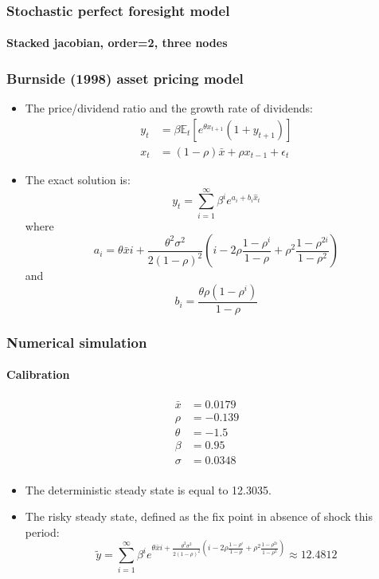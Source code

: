 \documentclass{beamer}
\begin{document}
\begin{frame}
    \frametitle{Stochastic perfect foresight model}
    \framesubtitle{Stacked jacobian, order=2, three nodes}
  \begin{center}
    \scalebox{.5}{
  }
  \end{center}

\end{frame}


\begin{frame}
  \frametitle{Burnside (1998) asset pricing model}

\begin{itemize}

  \item The price/dividend ratio and the growth rate of dividends:
  \[
    \begin{split}
      y_t &= \beta \mathbb E_t\left[e^{\theta x_{t+1}}\left(1+y_{t+1}\right)\right]\\
      x_t &= (1-\rho)\bar x + \rho x_{t-1}+\epsilon_t
    \end{split}
  \]

  \item The exact solution is:
\[
    y_t = \sum_{i=1}^\infty \beta^i e^{a_i+b_i\hat x_t}
\]
where
\[
    a_i = \theta \bar x i +
\frac{\theta^2\sigma^2}{2(1-\rho)^2}\left(i-2\rho\frac{1-\rho^i}{1-\rho}+\rho^2\frac{1-\rho^{2i}}{1-\rho^2}\right)
\]
and
\[
b_i = \frac{\theta\rho\left(1-\rho^i\right)}{1-\rho}
\]

\end{itemize}

\end{frame}


\begin{frame}
  \frametitle{Numerical simulation}
   \framesubtitle{Calibration}

\begin{align*}
  \bar x &= 0.0179\\
  \rho &=  -0.139\\
  \theta &= -1.5\\
  \beta &= 0.95\\
  \sigma &= 0.0348\\
\end{align*}

\medskip

\begin{itemize}
\item The deterministic steady state is equal to 12.3035.\newline
\item The risky steady state, defined as the fix point in absence of
  shock this period:
\[
\widetilde y = \sum_{i=1}^\infty \beta^i e^{\theta \bar x i +
\frac{\theta^2\sigma^2}{2(1-\rho)^2}\left(i-2\rho\frac{1-\rho^i}{1-\rho}+\rho^2\frac{1-\rho^{2i}}{1-\rho^2}\right)}\approx 12.4812
\]

\end{itemize}

\end{frame}
\end{document}
